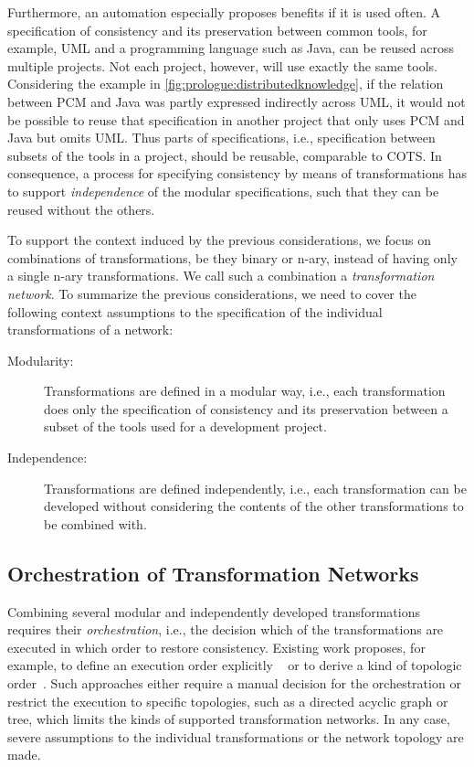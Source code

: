 Furthermore, an automation especially proposes benefits if it is used often.
A specification of consistency and its preservation between common tools, for example, \gls{UML} and a programming language such as Java, can be reused across multiple projects.
Not each project, however, will use exactly the same tools.
Considering the example in \autoref{fig:prologue:distributedknowledge}, if the relation between \gls{PCM} and Java was partly expressed indirectly across \gls{UML}, it would not be possible to reuse that specification in another project that only uses \gls{PCM} and Java but omits \gls{UML}.
Thus parts of specifications, i.e., specification between subsets of the tools in a project, should be reusable, comparable to \gls{COTS}.
In consequence, a process for specifying consistency by means of transformations has to support \emph{independence} of the modular specifications, such that they can be reused without the others.

To support the context induced by the previous considerations, we focus on combinations of transformations, be they binary or n-ary, instead of having only a single n-ary transformations.
We call such a combination a \emph{transformation network}.
To summarize the previous considerations, we need to cover the following context assumptions to the specification of the individual transformations of a network:
\begin{description}
    \item[Modularity:] Transformations are defined in a modular way, i.e., each transformation does only the specification of consistency and its preservation between a subset of the tools used for a development project.
    \item[Independence:] Transformations are defined independently, i.e., each transformation can be developed without considering the contents of the other transformations to be combined with.
\end{description}


\subsection{Orchestration of Transformation Networks}

Combining several modular and independently developed transformations requires their \emph{orchestration}, i.e., the decision which of the transformations are executed in which order to restore consistency.
Existing work proposes, for example, to define an execution order explicitly ~\cite{pilgrim2008a, vanhooff2007UniTI-MODELS} or to derive a kind of topologic order~\cite{stevens2020BidirectionalTransformationLarge-SoSym}.
Such approaches either require a manual decision for the orchestration or restrict the execution to specific topologies, such as a directed acyclic graph or tree, which limits the kinds of supported transformation networks.
In any case, severe assumptions to the individual transformations or the network topology are made.

